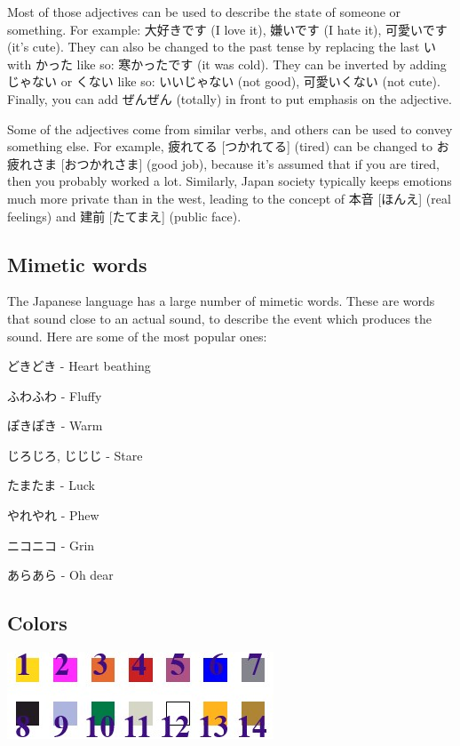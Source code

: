 \documentclass{article}
\begin{document}
\begin{CJK}{UTF8}{min}
\begin{multicols*}{3}
Most of those adjectives can be used to describe the state of someone or something. For example: 大好きです (I love it), 嫌いです (I hate it), 可愛いです (it's cute). They can also 
be changed to the past tense by replacing the last い with かった like so: 寒かったです (it was cold). They can be inverted by adding じゃない or くない like so: 
いいじゃない (not good), 可愛いくない (not cute). Finally, you can add ぜんぜん (totally) in front to put emphasis on the adjective.

Some of the adjectives come from similar verbs, and others can be used to convey something else. For example, 疲れてる [つかれてる] (tired) can be changed to お疲れさま [おつかれさま] 
(good job), because it's assumed that if you are tired, then you probably worked a lot. Similarly, Japan society typically keeps emotions much more private than in the west, 
leading to the concept of 本音 [ほんえ] (real feelings) and 建前 [たてまえ] (public face).

\subsection{Mimetic words}

The Japanese language has a large number of mimetic words. These are words that sound close to an actual sound, to describe the event which produces the sound. Here are some of the 
most popular ones:

\begin{colorize}
\item どきどき - Heart beathing
\item ふわふわ - Fluffy
\item ぽきぽき - Warm
\item じろじろ, じじじ - Stare
\item たまたま - Luck
\item やれやれ - Phew
\item ニコニコ - Grin
\item あらあら - Oh dear
\end{colorize}

\subsection{Colors}

\includegraphics{colors}


\end{multicols*}
\end{CJK}
\end{document}
